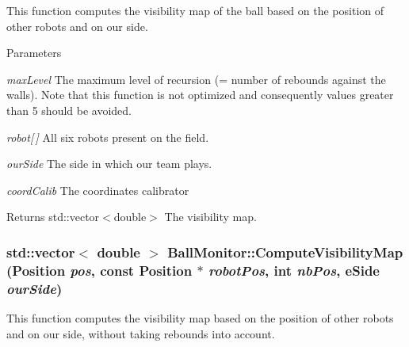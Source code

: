 This function computes the visibility map of the ball based on the position of other robots and on our side. 


\begin{DoxyParams}{Parameters}
\item[{\em maxLevel}]The maximum level of recursion (= number of rebounds against the walls). Note that this function is not optimized and consequently values greater than 5 should be avoided. \item[{\em robot\mbox{[}$\,$\mbox{]}}]All six robots present on the field. \item[{\em ourSide}]The side in which our team plays. \item[{\em coordCalib}]The coordinates calibrator \end{DoxyParams}
\begin{DoxyReturn}{Returns}
std::vector$<$double$>$ The visibility map. 
\end{DoxyReturn}
\hypertarget{classBallMonitor_a53e07299cf403dd036cab543d37fbf92}{
\subsubsection[{ComputeVisibilityMap}]{\setlength{\rightskip}{0pt plus 5cm}std::vector$<$ double $>$ BallMonitor::ComputeVisibilityMap (Position {\em pos}, \/  const Position $\ast$ {\em robotPos}, \/  int {\em nbPos}, \/  eSide {\em ourSide})}}
\label{classBallMonitor_a53e07299cf403dd036cab543d37fbf92}


This function computes the visibility map based on the position of other robots and on our side, without taking rebounds into account. 


